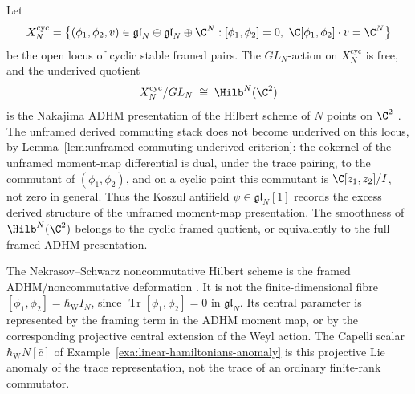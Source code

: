 \documentclass[11pt]{memoir}
\begin{document}
\begin{lem}\label{lem:cyclic-framing-hilbert-branch}\label{rmk:cyclic-framing-hilbert-branch}
  Let
  \[
    X^{\mathrm{cyc}}_N
     =\bigl\{(\phi_1,\phi_2,v)\in\mathfrak{gl}_N
                          \oplus\mathfrak{gl}_N\oplus\C^N
            :[\phi_1,\phi_2]=0,\
             \C[\phi_1,\phi_2]\cdot v=\C^N\bigr\}
  \]
  be the open locus of cyclic stable framed pairs.  The \(GL_N\)-action
  on \(X^{\mathrm{cyc}}_N\) is free, and the underived quotient
  \[
    X^{\mathrm{cyc}}_N/GL_N
     \;\cong\;\Hilb^N(\C^2)
  \]
  is the Nakajima ADHM presentation of the Hilbert scheme of \(N\)
  points on \(\C^2\) \cite{nakajima-hilbert-lectures}.  The unframed
  derived commuting stack does not become underived on this locus, by
  Lemma~\ref{lem:unframed-commuting-underived-criterion}:
  the cokernel of the unframed moment-map differential is dual, under
  the trace pairing, to the commutant of \((\phi_1,\phi_2)\), and on a
  cyclic point this commutant is \(\C[z_1,z_2]/I\), not zero in
  general.  Thus the Koszul antifield
  \(\psi\in\mathfrak{gl}_N[1]\) records the excess derived structure of
  the unframed moment-map presentation.  The smoothness of
  \(\Hilb^N(\C^2)\) belongs to the cyclic framed quotient, or
  equivalently to the full framed ADHM presentation.

  The Nekrasov--Schwarz noncommutative Hilbert scheme is the framed
  ADHM/noncommutative deformation
  \cite{nekrasov-schwarz-noncommutative}.  It is not the
  finite-dimensional fibre \([\phi_1,\phi_2]=\hbar_{\mathrm{W}} I_N\), since
  \(\operatorname{Tr}[\phi_1,\phi_2]=0\) in
  \(\mathfrak{gl}_N\).  Its central parameter is represented by the
  framing term in the ADHM moment map, or by the corresponding
  projective central extension of the Weyl action.  The Capelli scalar
	  \(\hbar_{\mathrm{W}}N[\bar c]\) of
	  Example~\ref{exa:linear-hamiltonians-anomaly} is this projective
  Lie anomaly of the trace representation, not the trace of an
  ordinary finite-rank commutator.
\end{lem}
\end{document}
